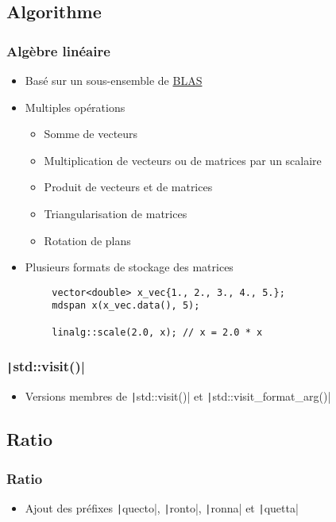 \documentclass[C++.tex]{subfiles}
\begin{document}
\subsection*{Algorithme}
\begin{frame}[fragile]
	\frametitle{Algèbre linéaire}
	\begin{itemize}
		\item Basé sur un sous-ensemble de \href{https://www.netlib.org/blas/}{BLAS\linklogo}
		\item Multiples opérations
		\begin{itemize}
			\item Somme de vecteurs
			\item Multiplication de vecteurs ou de matrices par un scalaire
			\item Produit de vecteurs et de matrices
			\item Triangularisation de matrices
			\item Rotation de plans
		\end{itemize}
		\item Plusieurs formats de stockage des matrices
	\end{itemize}

	\begin{verbatim}
		vector<double> x_vec{1., 2., 3., 4., 5.};
		mdspan x(x_vec.data(), 5);

		linalg::scale(2.0, x); // x = 2.0 * x
	\end{verbatim}

\end{frame}

\begin{frame}[fragile]
	\frametitle{\texttt|std::visit()|}
	\begin{itemize}
		\item Versions membres de \texttt|std::visit()| et \texttt|std::visit_format_arg()|
	\end{itemize}

\end{frame}

\subsection*{Ratio}
\begin{frame}[fragile]
	\frametitle{Ratio}
	\begin{itemize}
		\item Ajout des préfixes \texttt|quecto|, \texttt|ronto|, \texttt|ronna| et \texttt|quetta|
	\end{itemize}

\end{frame}
\end{document}
